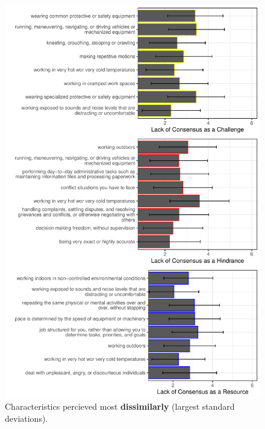 \documentclass[
  man]{apa7}
\begin{document}
\begin{figure}
\centering
\includegraphics{Submission_files/figure-latex/combinegraphs2-1.pdf}
\caption{\label{fig:combinegraphs2}Characteristics percieved most \textbf{dissimilarly} (largest standard deviations).}
\end{figure}
\end{document}
